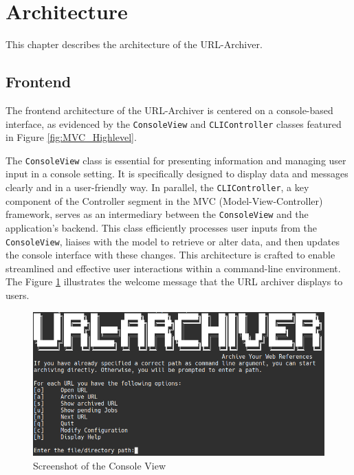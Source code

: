\section{Architecture}
This chapter describes the architecture of the URL-Archiver. 

\subsection{Frontend}
The frontend architecture of the URL-Archiver is centered on a console-based interface, as evidenced by the \texttt{ConsoleView} and \texttt{CLIController} classes featured in Figure \ref{fig:MVC_Highlevel}.

The \texttt{ConsoleView} class is essential for presenting information and managing user input in a console setting. It is specifically designed to display data and messages clearly and in a user-friendly way. In parallel, the \texttt{CLIController}, a key component of the Controller segment in the MVC (Model-View-Controller) framework, serves as an intermediary between the \texttt{ConsoleView} and the application’s backend. This class efficiently processes user inputs from the \texttt{ConsoleView}, liaises with the model to retrieve or alter data, and then updates the console interface with these changes. This architecture is crafted to enable streamlined and effective user interactions within a command-line environment. The Figure \ref{fig:Screenshot_ConsoleView} illustrates the welcome message that the URL archiver displays to users. 
\vskip 0.5cm
\begin{figure}[h!]
    \center
    \includegraphics[width=1\textwidth]{pictures/final_presentation/command_line_application.jpg}
    \caption{Screenshot of the Console View}
    \label{fig:Screenshot_ConsoleView}
\end{figure}



